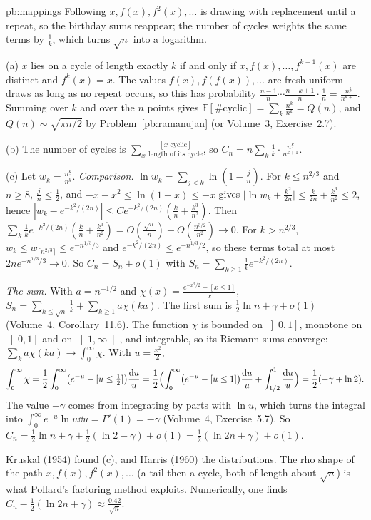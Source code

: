 \begin{solution}{pb:mappings}
\idea Following $x,f(x),f^2(x),\dots$ is drawing with replacement until a repeat, so the birthday sums reappear; the number of cycles weights the same terms
by $\frac1k$, which turns $\sqrt n$ into a logarithm.

\writeup (a) $x$ lies on a cycle of length exactly $k$ if and only if $x,f(x),\dots,f^{k-1}(x)$ are distinct and $f^k(x)=x$. The values $f(x),f(f(x)),\dots$ are fresh uniform draws as long as
no repeat occurs, so this has probability $\frac{n-1}n\cdots\frac{n-k+1}n\cdot\frac1n=\frac{n^{\underline k}}{n^{k+1}}$. Summing over $k$ and over the $n$ points gives $\mathbb E[\#\text{cyclic}]=\sum_k\frac{n^{\underline k}}{n^k}=Q(n)$,
and $Q(n)\sim\sqrt{\pi n/2}$ by Problem~\ref{pb:ramanujan} (or Volume~3, Exercise~2.7).

(b) The number of cycles is $\sum_x\frac{[x\text{ cyclic}]}{\text{length of its cycle}}$, so $C_n=n\sum_k\frac1k\cdot\frac{n^{\underline k}}{n^{k+1}}$.

(c) Let $w_k=\frac{n^{\underline k}}{n^k}$. \emph{Comparison.} $\ln w_k=\sum_{j<k}\ln(1-\frac jn)$. For $k\le n^{2/3}$ and $n\ge8$, $\frac jn\le\frac12$, and $-x-x^2\le\ln(1-x)\le-x$ gives
$\bigl|\ln w_k+\frac{k^2}{2n}\bigr|\le\frac k{2n}+\frac{k^3}{n^2}\le2$, hence $|w_k-e^{-k^2/(2n)}|\le Ce^{-k^2/(2n)}(\frac kn+\frac{k^3}{n^2})$. Then
$\sum_k\frac1ke^{-k^2/(2n)}(\frac kn+\frac{k^3}{n^2})=O(\frac{\sqrt n}n)+O(\frac{n^{3/2}}{n^2})\to0$. For $k>n^{2/3}$, $w_k\le w_{\lceil n^{2/3}\rceil}\le e^{-n^{1/3}/3}$ and $e^{-k^2/(2n)}\le e^{-n^{1/3}/2}$, so these terms total
at most $2ne^{-n^{1/3}/3}\to0$. So $C_n=S_n+o(1)$ with $S_n=\sum_{k\ge1}\frac1ke^{-k^2/(2n)}$.

\emph{The sum.} With $a=n^{-1/2}$ and $\chi(x)=\frac{e^{-x^2/2}-[x\le1]}x$, $S_n=\sum_{k\le\sqrt n}\frac1k+\sum_{k\ge1}a\chi(ka)$. The first sum is $\frac12\ln n+\gamma+o(1)$ (Volume~4, Corollary~11.6). The function
$\chi$ is bounded on $\left]0,1\right]$, monotone on $\left]0,1\right]$ and on $\left]1,\infty\right[$, and integrable, so its Riemann sums converge: $\sum_ka\chi(ka)\to\int_0^\infty\chi$. With $u=\frac{x^2}2$,
\[
\int_0^\infty\chi=\frac12\int_0^\infty\bigl(e^{-u}-[u\le\tfrac12]\bigr)\frac{\mathrm du}u=\frac12\Bigl(\int_0^\infty\bigl(e^{-u}-[u\le1]\bigr)\frac{\mathrm du}u+\int_{1/2}^1\frac{\mathrm du}u\Bigr)=\frac12(-\gamma+\ln2).
\]
The value $-\gamma$ comes from integrating by parts with $\ln u$, which turns the integral into $\int_0^\infty e^{-u}\ln u\dd u=\Gamma'(1)=-\gamma$ (Volume~4, Exercise~5.7). So
$C_n=\frac12\ln n+\gamma+\frac12(\ln2-\gamma)+o(1)=\frac12(\ln2n+\gamma)+o(1)$.

\leads Kruskal (1954) found (c), and Harris (1960) the distributions. The rho shape of the path $x,f(x),f^2(x),\dots$ (a tail then a cycle, both of length about
$\sqrt n$) is what Pollard's factoring method exploits. Numerically, one finds $C_n-\frac12(\ln2n+\gamma)\approx\frac{0.42}{\sqrt n}$.
\end{solution}


